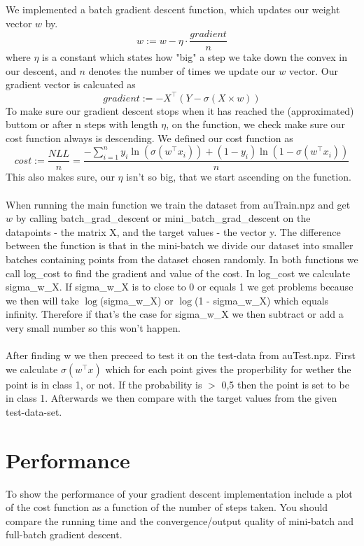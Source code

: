 \documentclass[paper=a4, fontsize=11pt]{scrartcl} %
\numberwithin{equation}{section} %
\numberwithin{figure}{section} %
\numberwithin{table}{section} %
\begin{document}
	We implemented a batch gradient descent function, which updates our weight vector $w$ by.
	\begin{equation}
		w:= w - \eta\cdot \dfrac{gradient}{n}
	\end{equation}
	where $\eta$ is a constant which states how "big" a step we take down the convex in our descent, and $n$ denotes the number of times we update our $w$ vector. Our gradient vector is calcuated as
	\begin{equation}
		gradient:= -X^\intercal(Y-\sigma(X\times w))
	\end{equation}
	To make sure our gradient descent stops when it has reached the (approximated) buttom or after n steps with length $\eta$, on the function, we check make sure our cost function always is descending. We defined our cost function as
	\begin{equation*}
		cost := \dfrac{NLL}{n} = \dfrac{- \sum_{i=1}^n y_i \ln(\sigma(w^\intercal x_i)) + (1-y_i) \ln(1-\sigma(w^\intercal x_i))}{n}
	\end{equation*}
	This also makes sure, our $\eta$ isn't so big, that we start ascending on the function. \\ \\
	When running the main function we train the dataset from auTrain.npz and get $w$ by calling batch{\_}grad{\_}descent or mini{\_}batch{\_}grad{\_}descent on the datapoints - the matrix X, and the target values - the vector y. The difference between the function is that in the mini-batch we divide our dataset into smaller batches containing points from the dataset chosen randomly. In both functions we call log{\_}cost to find the gradient and value of the cost. In log{\_}cost we calculate sigma{\_}w{\_}X. If sigma{\_}w{\_}X is to close to 0 or equals 1 we get problems because we then will take $\log$(sigma{\_}w{\_}X) or $\log$(1 - sigma{\_}w{\_}X) which equals infinity. Therefore if that's the case for sigma{\_}w{\_}X we then subtract or add a very small number so this won't happen.
	\\\\
	After finding w we then preceed to test it on the test-data from auTest.npz. First we calculate $\sigma(w^\intercal x)$ which for each point gives the properbility for wether the point is in class 1, or not. If the probability is $>$ 0,5 then the point is set to be in class 1. Afterwards we then compare with the target values from the given test-data-set.
	
	\section*{Performance}
	To show the performance of your gradient descent implementation include a plot of the cost function as a function of the number of steps taken. You should compare the running time and the convergence/output quality of mini-batch and full-batch gradient descent. \\ \\
	
\end{document}
